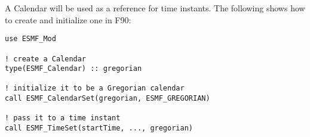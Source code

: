 
A Calendar will be used as a reference for time instants.
The following shows how to create and initialize one in F90:

\begin{verbatim}
use ESMF_Mod

! create a Calendar
type(ESMF_Calendar) :: gregorian

! initialize it to be a Gregorian calendar
call ESMF_CalendarSet(gregorian, ESMF_GREGORIAN)

! pass it to a time instant
call ESMF_TimeSet(startTime, ..., gregorian)
\end{verbatim}
